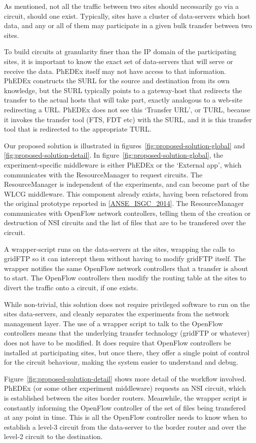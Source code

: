 As mentioned, not all the traffic between two sites should necessarily go via a circuit, should one exist. Typically, sites have a cluster of data-servers which host data, and any or all of them may participate in a given bulk transfer between two sites.

To build circuits at granularity finer than the IP domain of the participating sites, it is important to know the exact set of data-servers that will serve or receive the data. PhEDEx itself may not have access to that information. PhEDEx constructs the SURL for the source and destination from its own knowledge, but the SURL typically points to a gateway-host that redirects the transfer to the actual hosts that will take part, exactly analogous to a web-site redirecting a URL. PhEDEx does not see this `Transfer URL', or TURL, because it invokes the transfer tool (FTS, FDT etc) with the SURL, and it is this transfer tool that is redirected to the appropriate TURL.

Our proposed solution is illustrated in figures~\ref{fig:proposed-solution-global} and \ref{fig:proposed-solution-detail}. In figure~\ref{fig:proposed-solution-global}, the experiment-specific middleware is either PhEDEx or the `External app', which communicates with the ResourceManager to request circuits. The ResourceManager is independent of the experiments, and can become part of the WLCG middleware. This component already exists, having been refactored from the original prototype reported in \ref{ANSE_ISGC_2014}. The ResourceManager communicates with OpenFlow network controllers, telling them of the creation or destruction of NSI circuits and the list of files that are to be transfered over the circuit.

A wrapper-script runs on the data-servers at the sites, wrapping the calls to gridFTP so it can intercept them without having to modify gridFTP itself. The wrapper notifies the same OpenFlow network controllers that a transfer is about to start. The OpenFlow controllers then modify the routing table at the sites to divert the traffic onto a circuit, if one exists.

While non-trivial, this solution does not require privileged software to run on the sites data-servers, and cleanly separates the experiments from the network management layer. The use of a wrapper script to talk to the OpenFlow controllers means that the underlying transfer technology (gridFTP or whatever) does not have to be modified. It does require that OpenFlow controllers be installed at participating sites, but once there, they offer a single point of control for the circuit behaviour, making the system easier to understand and debug.

Figure~\ref{fig:proposed-solution-detail} shows more detail of the workflow involved. PhEDEx (or some other experiment middleware) requests an NSI circuit, which is established between the sites border routers. Meanwhile, the wrapper script is constantly informing the OpenFlow controller of the set of files being transfered at any point in time. This is all the OpenFlow controller needs to know when to establish a level-3 circuit from the data-server to the border router and over the level-2 circuit to the destination.